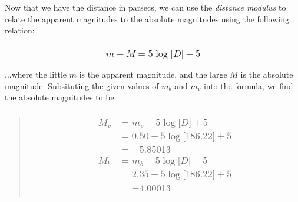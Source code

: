 \documentclass[
]{article}
\begin{document}
Now that we have the distance in parsecs, we can use the \emph{distance
modulus} to relate the apparent magnitudes to the absolute magnitudes
using the following relation:

\hypertarget{m---m-5loglbrack-drbrack---5}{%
\subsubsection{\texorpdfstring{{\[m - M = 5\log\lbrack D\rbrack - 5\]}}{m - M = 5\textbackslash log\textbackslash lbrack D\textbackslash rbrack - 5}}\label{m---m-5loglbrack-drbrack---5}}

...where the little {\(m\)} is the apparent magnitude, and the large
{\(M\)} is the absolute magnitude. Subsituting the given values of
{\(m_{b}\)} and {\(m_{v}\)} into the formula, we find the absolute
magnitudes to be:

\begin{quote}
\hypertarget{beginmatrix-m_v-m_v---5loglbrack-drbrack-5-0.50---5loglbrack-186.22rbrack-5---5.85013-m_b-m_b---5loglbrack-drbrack-5-2.35---5loglbrack-186.22rbrack-5---4.00013-endmatrix}{%
\subsubsection{\texorpdfstring{{\[\begin{matrix}
M_{v} & {= m_{v} - 5\log\lbrack D\rbrack + 5} \\
 & {= 0.50 - 5\log\lbrack 186.22\rbrack + 5} \\
 & {= - 5.85013} \\
M_{b} & {= m_{b} - 5\log\lbrack D\rbrack + 5} \\
 & {= 2.35 - 5\log\lbrack 186.22\rbrack + 5} \\
 & {= - 4.00013} \\
\end{matrix}\]}}{\textbackslash begin\{matrix\}
M\_\{v\} \& \{= m\_\{v\} - 5\textbackslash log\textbackslash lbrack D\textbackslash rbrack + 5\} \textbackslash\textbackslash{}
 \& \{= 0.50 - 5\textbackslash log\textbackslash lbrack 186.22\textbackslash rbrack + 5\} \textbackslash\textbackslash{}
 \& \{= - 5.85013\} \textbackslash\textbackslash{}
M\_\{b\} \& \{= m\_\{b\} - 5\textbackslash log\textbackslash lbrack D\textbackslash rbrack + 5\} \textbackslash\textbackslash{}
 \& \{= 2.35 - 5\textbackslash log\textbackslash lbrack 186.22\textbackslash rbrack + 5\} \textbackslash\textbackslash{}
 \& \{= - 4.00013\} \textbackslash\textbackslash{}
\textbackslash end\{matrix\}}}\label{beginmatrix-m_v-m_v---5loglbrack-drbrack-5-0.50---5loglbrack-186.22rbrack-5---5.85013-m_b-m_b---5loglbrack-drbrack-5-2.35---5loglbrack-186.22rbrack-5---4.00013-endmatrix}}
\end{quote}
\end{document}
